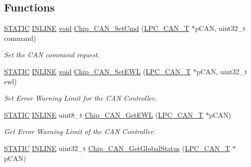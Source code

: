 \subsection*{Functions}
\begin{DoxyCompactItemize}
\item 
\hyperlink{group__LPC__Types__Public__Macros_ga10b2d890d871e1489bb02b7e70d9bdfb}{S\-T\-A\-T\-I\-C} \hyperlink{group__LPC__Types__Public__Types_ga2eb6f9e0395b47b8d5e3eeae4fe0c116}{I\-N\-L\-I\-N\-E} \hyperlink{Paradigm_2Tern__EE_2small_2portmacro_8h_a14d32f8130d3c0b212cfc751730b5b49}{void} \hyperlink{group__CAN__17XX__40XX_ga204f7aa9af769ea809d9dc54ef4408a9}{Chip\-\_\-\-C\-A\-N\-\_\-\-Set\-Cmd} (\hyperlink{structLPC__CAN__T}{L\-P\-C\-\_\-\-C\-A\-N\-\_\-\-T} $\ast$p\-C\-A\-N, uint32\-\_\-t command)
\begin{DoxyCompactList}\small\item\em Set the C\-A\-N command request. \end{DoxyCompactList}\item 
\hyperlink{group__LPC__Types__Public__Macros_ga10b2d890d871e1489bb02b7e70d9bdfb}{S\-T\-A\-T\-I\-C} \hyperlink{group__LPC__Types__Public__Types_ga2eb6f9e0395b47b8d5e3eeae4fe0c116}{I\-N\-L\-I\-N\-E} \hyperlink{Paradigm_2Tern__EE_2small_2portmacro_8h_a14d32f8130d3c0b212cfc751730b5b49}{void} \hyperlink{group__CAN__17XX__40XX_ga70f13e4a2f4cd74d56e14b0c6343c8df}{Chip\-\_\-\-C\-A\-N\-\_\-\-Set\-E\-W\-L} (\hyperlink{structLPC__CAN__T}{L\-P\-C\-\_\-\-C\-A\-N\-\_\-\-T} $\ast$p\-C\-A\-N, uint32\-\_\-t ewl)
\begin{DoxyCompactList}\small\item\em Set Error Warning Limit for the C\-A\-N Controller. \end{DoxyCompactList}\item 
\hyperlink{group__LPC__Types__Public__Macros_ga10b2d890d871e1489bb02b7e70d9bdfb}{S\-T\-A\-T\-I\-C} \hyperlink{group__LPC__Types__Public__Types_ga2eb6f9e0395b47b8d5e3eeae4fe0c116}{I\-N\-L\-I\-N\-E} uint8\-\_\-t \hyperlink{group__CAN__17XX__40XX_ga7a4f26336007dc7ebba7163ed449e384}{Chip\-\_\-\-C\-A\-N\-\_\-\-Get\-E\-W\-L} (\hyperlink{structLPC__CAN__T}{L\-P\-C\-\_\-\-C\-A\-N\-\_\-\-T} $\ast$p\-C\-A\-N)
\begin{DoxyCompactList}\small\item\em Get Error Warning Limit of the C\-A\-N Controller. \end{DoxyCompactList}\item 
\hyperlink{group__LPC__Types__Public__Macros_ga10b2d890d871e1489bb02b7e70d9bdfb}{S\-T\-A\-T\-I\-C} \hyperlink{group__LPC__Types__Public__Types_ga2eb6f9e0395b47b8d5e3eeae4fe0c116}{I\-N\-L\-I\-N\-E} uint32\-\_\-t \hyperlink{group__CAN__17XX__40XX_ga524163e227eb47b1ddae20b2abc6d588}{Chip\-\_\-\-C\-A\-N\-\_\-\-Get\-Global\-Status} (\hyperlink{structLPC__CAN__T}{L\-P\-C\-\_\-\-C\-A\-N\-\_\-\-T} $\ast$p\-C\-A\-N)

\end{DoxyCompactItemize}
